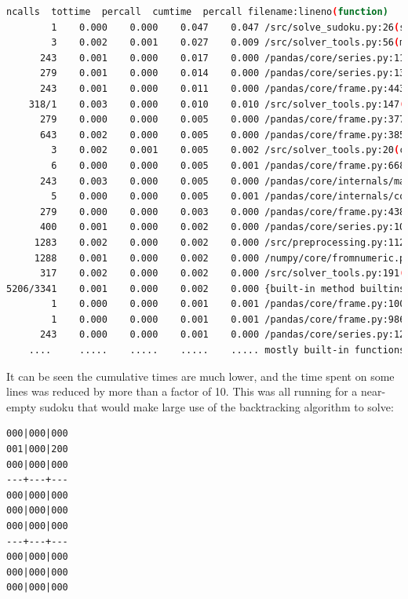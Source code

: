\documentclass[12pt]{report} %
\begin{document}
\begin{lstlisting}[language=Bash, caption={Profiling output after list comprehension improvements}, basicstyle=\tiny]
   ncalls  tottime  percall  cumtime  percall filename:lineno(function)
        1    0.000    0.000    0.047    0.047 /src/solve_sudoku.py:26(solve_sudoku)
        3    0.002    0.001    0.027    0.009 /src/solver_tools.py:56(markup)
      243    0.001    0.000    0.017    0.000 /pandas/core/series.py:1180(__setitem__)
      279    0.001    0.000    0.014    0.000 /pandas/core/series.py:1396(_maybe_update_cacher)
      243    0.001    0.000    0.011    0.000 /pandas/core/frame.py:4430(_maybe_cache_changed)
    318/1    0.003    0.000    0.010    0.010 /src/solver_tools.py:147(backtrack_alg)
      279    0.000    0.000    0.005    0.000 /pandas/core/frame.py:3779(_ixs)
      643    0.002    0.000    0.005    0.000 /pandas/core/frame.py:3856(__getitem__)
        3    0.002    0.001    0.005    0.002 /src/solver_tools.py:20(check_sudoku)
        6    0.000    0.000    0.005    0.001 /pandas/core/frame.py:668(__init__)
      243    0.003    0.000    0.005    0.000 /pandas/core/internals/managers.py:1045(iset)
        5    0.000    0.000    0.005    0.001 /pandas/core/internals/construction.py:423(dict_to_mgr)
      279    0.000    0.000    0.003    0.000 /pandas/core/frame.py:4387(_box_col_values)
      400    0.001    0.000    0.002    0.000 /pandas/core/series.py:1016(__getitem__)
     1283    0.002    0.000    0.002    0.000 /src/preprocessing.py:112(box)
     1288    0.001    0.000    0.002    0.000 /numpy/core/fromnumeric.py:1768(ravel)
      317    0.002    0.000    0.002    0.000 /src/solver_tools.py:191(<listcomp>)
5206/3341    0.001    0.000    0.002    0.000 {built-in method builtins.len}
        1    0.000    0.000    0.001    0.001 /pandas/core/frame.py:10039(map)
        1    0.000    0.000    0.001    0.001 /pandas/core/frame.py:9867(apply)
      243    0.000    0.000    0.001    0.000 /pandas/core/series.py:1270(_set_with_engine)
    ....     .....    .....    .....    ..... mostly built-in functions of packages

\end{lstlisting}

It can be seen the cumulative times are much lower, and the time spent on some lines was reduced by more than a factor of 10. This was all running for a near-empty sudoku that would make large use of the backtracking algorithm to solve:

\begin{lstlisting}[caption = {sudoku\_near\_empty.txt}]
000|000|000
001|000|200
000|000|000
---+---+---
000|000|000
000|000|000
000|000|000
---+---+---
000|000|000
000|000|000
000|000|000
\end{lstlisting}
\end{document}
